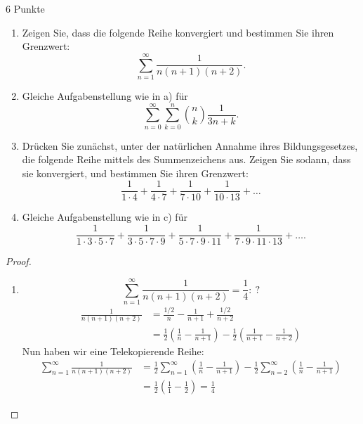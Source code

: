 \documentclass{problemset}
\author{Michael van Straten}
\begin{document}
\maketitle

\begin{problem}{6 Punkte}
\begin{enumerate}
	\item Zeigen Sie, dass die folgende Reihe konvergiert und bestimmen Sie ihren Grenzwert:
	      \[
		      \sum_{n=1}^{\infty} \frac{1}{n(n + 1)(n + 2)}.
	      \]
	\item Gleiche Aufgabenstellung wie in a) für
	      \[
		      \sum_{n=0}^{\infty} \sum_{k=0}^{n} {n \choose k} \frac{1}{3n+k}.
	      \]
	\item Drücken Sie zunächst, unter der natürlichen Annahme ihres Bildungsgesetzes, die folgende Reihe mittels des Summenzeichens aus. Zeigen Sie sodann, dass sie konvergiert, und bestimmen Sie ihren Grenzwert:
	      \[
		      \frac{1}{1 \cdot 4 } + \frac{1}{4 \cdot 7 } + \frac{1}{7 \cdot 10} + \frac{1}{10 \cdot 13} + \ldots
	      \]
	\item Gleiche Aufgabenstellung wie in c) für
	      \[
		      \frac{1}{1 \cdot 3 \cdot 5 \cdot 7 } + \frac{1}{3 \cdot 5 \cdot 7 \cdot 9} + \frac{1}{5 \cdot 7 \cdot 9 \cdot 11} + \frac{1}{7 \cdot 9 \cdot 11 \cdot 13} + \ldots.
	      \]
\end{enumerate}
\begin{proof}
	\begin{enumerate}
		\item
		      \[
			      \sum_{n = 1}^{\infty}\frac{1}{n(n + 1)(n + 2)} = \frac{1}{4}:\ ?
		      \]
		      \begin{align}
			      \frac{1}{n(n + 1)(n + 2)} & = \frac{1/2}{n} - \frac{1}{n + 1} + \frac{1/2}{n + 2}                                                               \\
			                                & = \frac{1}{2}\left(\frac{1}{n} - \frac{1}{n + 1}\right) - \frac{1}{2}\left(\frac{1}{n + 1} - \frac{1}{n + 2}\right)
		      \end{align}
		      Nun haben wir eine Telekopierende Reihe:
		      \begin{align}
			      \sum_{n = 1}^{\infty}\frac{1}{n(n + 1)(n + 2)} & = \frac{1}{2}\sum_{n = 1}^{\infty}\left(\frac{1}{n} - \frac{1}{n + 1}\right) - \frac{1}{2}\sum_{n = 2}^{\infty}\left(\frac{1}{n} - \frac{1}{n + 1}\right) \\
			                                                     & = \frac{1}{2}\left(\frac{1}{1} - \frac{1}{2}\right) = \frac{1}{4}

\end{align}
\end{enumerate}
\end{proof}
\end{problem}
\end{document}
